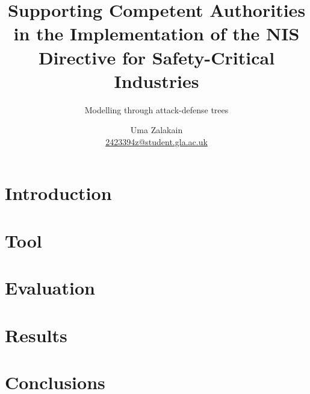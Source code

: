 \documentclass{scrreprt}
\begin{document}
\title{Supporting Competent Authorities in the Implementation of the NIS
Directive for Safety-Critical Industries}
\subtitle{Modelling through attack-defense trees}
\author{Uma Zalakain \\ \href{mailto:2423394z@student.gla.ac.uk}{2423394z@student.gla.ac.uk}}

{\let\newpage\relax\maketitle}
\doclicenseThis
\newpage

\setcounter{tocdepth}{2}
\tableofcontents
\newpage
{}

\chapter{Introduction}


\chapter{Tool}


\cite{Kordy2013a}
\cite{Kordy}

\chapter{Evaluation}

\chapter{Results}

\chapter{Conclusions}




\newpage
\begin{appendices}
\end{appendices}
\end{document}
